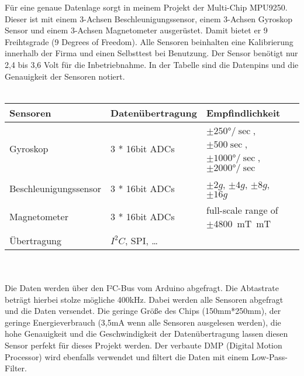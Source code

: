 Für eine genaue Datenlage sorgt in meinem Projekt der Multi-Chip MPU9250. Dieser ist mit 
einem 3-Achsen Beschleunigungssensor, einem 3-Achsen Gyroskop Sensor und einem 3-Achsen 
Magnetometer ausgerüstet. Damit bietet er 9 Freihtsgrade (9 Degrees of Freedom).
Alle Sensoren beinhalten eine Kalibrierung innerhalb der 
Firma und einen Selbsttest bei Benutzung. Der Sensor benötigt nur 2,4 bis 3,6 Volt für die 
Inbetriebnahme. In der Tabelle sind die Datenpins und die Genauigkeit der Sensoren notiert.\\
\\
\begin{tabularx}{0.8\textwidth}{l|X|XX}
Sensoren & Datenübertragung & Empfindlichkeit                                     \\
\hline
Gyroskop & 3 * 16bit ADCs & $\pm250°/\sec$, $\pm500\sec$, $\pm1000°/\sec$, $\pm2000°/\sec$\\ 
\hline
Beschleunigungssensor & 3 * 16bit ADCs & $\pm2g$, $\pm4g$, $\pm8g$, $\pm16g$\\
\hline
Magnetometer & 3 * 16bit ADCs & full-scale range of $\pm$\SI{4800}{\milli\tesla\meter}T \\
\hline
Übertragung & $I^2C$, SPI, \dots & \\
\end{tabularx}
\\
\\
Die Daten werden über den I²C-Bus vom Arduino abgefragt. Die Abtastrate beträgt hierbei 
stolze mögliche 400kHz. Dabei werden alle Sensoren abgefragt und die Daten versendet.
Die geringe Größe des Chips (150mm*250mm), der geringe Energieverbrauch (3,5mA wenn 
alle Sensoren ausgelesen werden), die hohe Genauigkeit und die Geschwindigkeit der 
Datenübertragung lassen diesen Sensor perfekt für dieses Projekt werden. Der verbaute
DMP (Digital Motion Processor) wird ebenfalls verwendet und filtert die Daten mit einem
Low-Pass-Filter.

